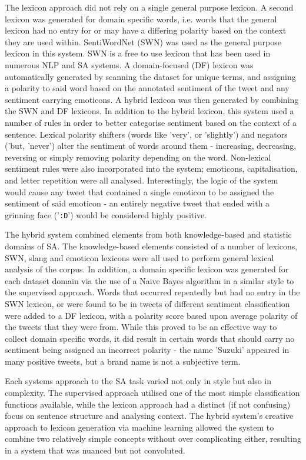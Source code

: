 \documentclass[twocolumn]{article}
\begin{document}
The lexicon approach did not rely on a single general purpose lexicon. A
second lexicon was generated for domain specific words, i.e. words that the
general lexicon had no entry for or may have a differing polarity based on the
context they are used within.
SentiWordNet (SWN) was used as the general purpose lexicon in this system.
SWN is a free to use lexicon that has been used in numerous NLP and SA
systems.
A domain-focused (DF) lexicon was automatically generated by scanning the
dataset for unique terms, and assigning a polarity to said word based on the
annotated sentiment of the tweet and any sentiment carrying emoticons.
A hybrid lexicon was then generated by combining the SWN and DF lexicons.
In addition to the hybrid lexicon, this system  used a number of rules in
order to better categorise sentiment based on the context of a sentence.
Lexical polarity shifters (words like 'very', or 'slightly') and negators
('but, 'never') alter the sentiment of words around them - increasing,
decreasing, reversing or simply removing polarity depending on the word.
Non-lexical sentiment rules were also incorporated into the system;
emoticons, capitalisation, and letter repetition were all analysed.
Interestingly, the logic of the system would cause any tweet that contained a
single emoticon to be assigned the sentiment of said emoticon - an entirely
negative tweet that ended with a grinning face ('{\tt:D}') would be considered
highly positive.

The hybrid system combined elements from both knowledge-based and statistic
domains of SA.
The knowledge-based elements consisted of a number of lexicons, SWN, slang and
emoticon lexicons were all used to perform general lexical analysis of the
corpus.
In addition, a domain specific lexicon was generated for each dataset domain
via the use of a Naive Bayes algorithm in a similar style to the supervised
approach.
Words that occurred repeatedly but had no entry in the SWN lexicon, or were
found to be in tweets of different sentiment classification were added to a
DF lexicon, with a polarity score based upon average polarity of the tweets
that they were from.
While this proved to be an effective way to collect domain specific words,
it did result in certain words that should carry no sentiment being assigned
an incorrect polarity - the name 'Suzuki' appeared in many positive tweets, but
a brand name is not a subjective term.

Each systems approach to the SA task varied not only in style but also in
complexity.
The supervised approach utilised one of the most simple classification
functions available, while the lexicon approach had a distinct (if not
confusing) focus on sentence structure and analysing context.
The hybrid system's creative approach to lexicon generation via machine
learning allowed the system to combine two relatively simple concepts without
over complicating either, resulting in a system that was nuanced but not
convoluted.
\end{document}
